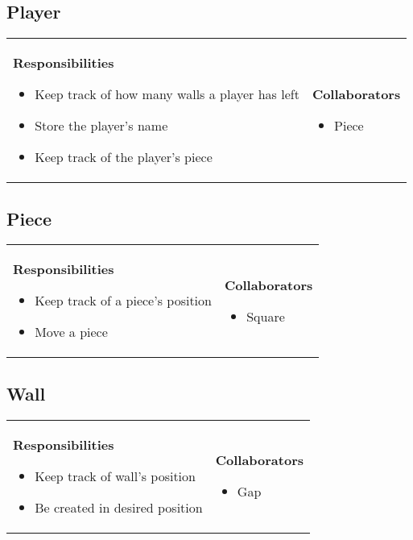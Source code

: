 \documentclass[a4paper]{article}
\begin{document}
\subsection*{Player}

\begin{tabular}{p{9cm}p{3cm}}
    \textbf{Responsibilities}
    \begin{itemize}
    \item Keep track of how many walls a player has left
    \item Store the player's name
    \item Keep track of the player's piece
    \end{itemize}
    &
    \textbf{Collaborators}
    \begin{itemize}
    \item Piece
    \end{itemize}
\end{tabular}

\subsection*{Piece}

\begin{tabular}{p{9cm}p{3cm}}
    \textbf{Responsibilities}
    \begin{itemize}
    \item Keep track of a piece's position
    \item Move a piece
    \end{itemize}
    &
    \textbf{Collaborators}
    \begin{itemize}
    \item Square
    \end{itemize}
\end{tabular}



\subsection*{Wall}
\begin{tabular}{p{9cm}p{3cm}}
    \textbf{Responsibilities}
    \begin{itemize}
    \item Keep track of wall's position
    \item Be created in desired position
    \end{itemize}
    &
    \textbf{Collaborators}
    \begin{itemize}
    \item Gap
    \end{itemize}
\end{tabular}
\end{document}
